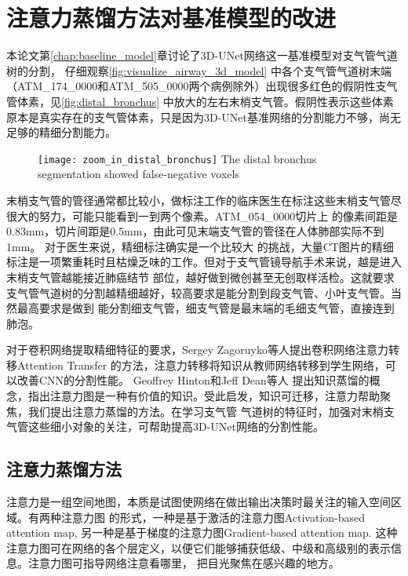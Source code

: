 
\chapter{注意力蒸馏方法对基准模型的改进}\label{chap:attention_distillation}

本论文第\ref{chap:baseline_model}章讨论了3D-UNet网络这一基准模型对支气管气道树的分割， 仔细观察\autoref{fig:visualize_airway_3d_model}
中各个支气管气道树末端（ATM\_174\_0000和ATM\_505\_0000两个病例除外）出现很多红色的假阴性支气管体素，见\autoref{fig:distal_bronchus}
中放大的左右末梢支气管。假阴性表示这些体素原本是真实存在的支气管体素，只是因为3D-UNet基准网络的分割能力不够，尚无足够的精细分割能力。
\begin{figure}[!htp]
    \centering
    \texttt{[image: zoom\_in\_distal\_bronchus]}
        {The distal bronchus segmentation showed false-negative voxels}
    \label{fig:distal_bronchus}
\end{figure}
末梢支气管的管径通常都比较小，做标注工作的临床医生在标注这些末梢支气管尽很大的努力，可能只能看到一到两个像素。ATM\_054\_0000切片上
的像素间距是0.83mm，切片间距是0.5mm，由此可见末端支气管的管径在人体肺部实际不到1mm。 对于医生来说，精细标注确实是一个比较大
的挑战，大量CT图片的精细标注是一项繁重耗时且枯燥乏味的工作。但对于支气管镜导航手术来说，越是进入末梢支气管越能接近肺癌结节
部位，越好做到微创甚至无创取样活检。这就要求支气管气道树的分割越精细越好，较高要求是能分割到段支气管、小叶支气管。当然最高要求是做到
能分割细支气管，细支气管是最末端的毛细支气管，直接连到肺泡。

对于卷积网络提取精细特征的要求，Sergey Zagoruyko等人\cite{Zagoruyko2016PayingMA}提出卷积网络注意力转移Attention Transfer
的方法，注意力转移将知识从教师网络转移到学生网络，可以改善CNN的分割性能。 Geoffrey Hinton和Jeff Dean等人\cite{Hinton2015DistillingTK}
提出知识蒸馏的概念，指出注意力图是一种有价值的知识。受此启发，知识可迁移，注意力帮助聚焦，我们提出注意力蒸馏的方法。在学习支气管
气道树的特征时，加强对末梢支气管这些细小对象的关注，可帮助提高3D-UNet网络的分割性能。

\section{注意力蒸馏方法}

注意力是一组空间地图，本质是试图使网络在做出输出决策时最关注的输入空间区域\cite{Zagoruyko2016PayingMA}。有两种注意力图
的形式，一种是基于激活的注意力图Activation-based attention map, 另一种是基于梯度的注意力图Gradient-based 
attention map. 这种注意力图可在网络的各个层定义，以便它们能够捕获低级、中级和高级别的表示信息。注意力图可指导网络注意看哪里，
把目光聚焦在感兴趣的地方。 

